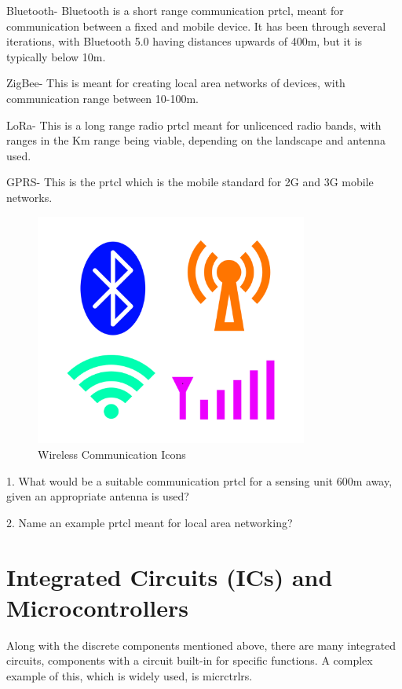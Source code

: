 \documentclass[a4paper,11pt]{report}
\newcommand{\Quiz}[1] %
{
\par\noindent %
\phantomsection %
\todo[inline, color=blue!30]{\textbf{#1}} %
\vspace{1em} %
}
\begin{document}
Bluetooth- Bluetooth is a short range communication \gls{prtcl}, meant for communication between a fixed and mobile device. It has been through several iterations, with Bluetooth 5.0 having distances upwards of 400m, but it is typically below 10m.

ZigBee- This is meant for creating local area networks of devices, with communication range between 10-100m.

LoRa- This is a long range radio \gls{prtcl} meant for unlicenced radio bands, with ranges in the Km range being viable, depending on the landscape and antenna used.

GPRS- This is the \gls{prtcl} which is the mobile standard for 2G and 3G mobile networks.

\begin{figure}[H]
\centering
\includegraphics[width=0.8\textwidth]{wirelesslogos}
\caption{Wireless Communication Icons}
\end{figure}

\Quiz{Quiz}

1. What would be a suitable communication \gls{prtcl} for a sensing unit 600m away, given an appropriate antenna is used?

2. Name an example \gls{prtcl} meant for local area networking?

\pagebreak

\section{Integrated Circuits (ICs) and Microcontrollers}

Along with the discrete components mentioned above, there are many integrated circuits, components with a circuit built-in for specific functions. A complex example of this, which is widely used, is \gls{micrctrlr}s.
\end{document}
